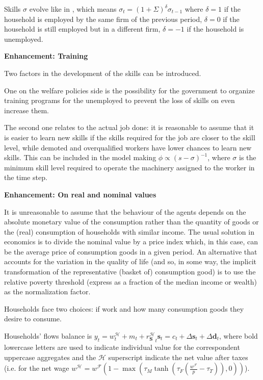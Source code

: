 \documentclass[a4paper, headings=standardclasses]{scrartcl}
\newenvironment{enh}[1][]{\begin{framed}\noindent\textbf{Enhancement: #1}\par}{\end{framed}}
\begin{document}
Skills $\sigma$ evolve like in \textcite{dosi2018}, which means $\sigma_t = (1+\Sigma)^\delta \sigma_{t-1}$ where $\delta=1$ if the household is employed by the same firm of the previous period, $\delta=0$ if the household is still employed but in a different firm, $\delta=-1$ if the household is unemployed.

\begin{enh}[Training]
    Two factors in the development of the skills can be introduced.

    One on the welfare policies side is the possibility for the government to organize training programs for the unemployed to prevent the loss of skills on even increase them.

    The second one relates to the actual job done: it is reasonable to assume that it is easier to learn new skills if the skills required for the job are closer to the skill level, while demoted and overqualified workers have lower chances to learn new skills. This can be included in the model making $\phi \propto (s-\sigma)^{-1}$, where $\sigma$ is the minimum skill level required to operate the machinery assigned to the worker in the time step.
\end{enh}

\begin{enh}[On real and nominal values]
    It is unreasonable to assume that the behaviour of the agents depends on the absolute monetary value of the consumption rather than the quantity of goods or the (real) consumption of households with similar income.
    The usual solution in economics is to divide the nominal value by a price index which, in this case, can be the average price of consumption goods in a given period.
    An alternative that accounts for the variation in the quality of life (and so, in some way, the implicit transformation of the representative (basket of) consumption good) is to use the relative poverty threshold (express as a fraction of the median income or wealth) as the normalization factor.
\end{enh}

Households face two choices: if work and how many consumption goods they desire to consume.

Households' flows balance is $y_t = w^{\mathcal{H}}_t + m_t + {r^{\mathcal{H}}_{\mathbf{S}}}_t \mathbf{s}_t = c_t + {\Delta \mathbf{s}}_t + {\Delta \mathbf{d}}_t$, where bold lowercase letters are used to indicate individual value for the correspondent uppercase aggregates and the $\mathcal{H}$ superscript indicate the net value after taxes (i.e. for the net wage $w^\mathcal{H} = w^{\mathcal{F}} (1 - \max(\tau_M \tanh(\tau_F(\frac{w^{\mathcal{F}}}{p}-\tau_T)),0))$).
\end{document}
